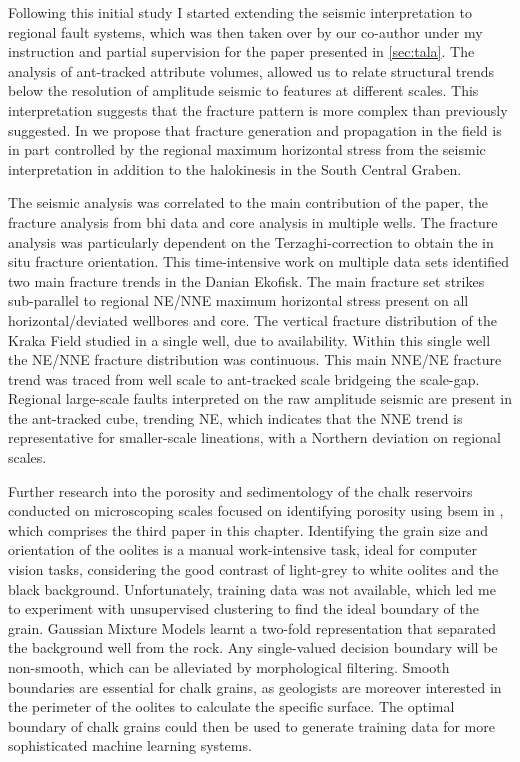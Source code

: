 Following this initial study I started extending the seismic interpretation to regional fault systems, which was then taken over by our co-author under my instruction and partial supervision for the paper presented in \cref{sec:tala}. The analysis of ant-tracked attribute volumes, allowed us to relate structural trends below the resolution of amplitude seismic to features at different scales. This interpretation suggests that the fracture pattern is more complex than previously suggested. In \citet{aabo2018integrated} we propose that fracture generation and propagation in the field is in part controlled by the regional maximum horizontal stress from the seismic interpretation in addition to the halokinesis in the South Central Graben. 

The seismic analysis was correlated to the main contribution of the paper, the fracture analysis from \ac{bhi} data and core analysis in multiple wells. The fracture analysis was particularly dependent on the Terzaghi-correction \citep{terzaghi1965sources} to obtain the in situ fracture orientation. This time-intensive work on multiple data sets identified two main fracture trends in the Danian Ekofisk. The main fracture set strikes sub-parallel to regional NE/NNE maximum horizontal stress present on all horizontal/deviated wellbores and core. The vertical fracture distribution of the Kraka Field studied in a single well, due to availability. Within this single well the NE/NNE fracture distribution was continuous. This main NNE/NE fracture trend was traced from well scale to ant-tracked scale bridgeing the scale-gap. Regional large-scale faults interpreted on the raw amplitude seismic are present in the ant-tracked cube, trending NE, which indicates that the NNE trend is representative for smaller-scale lineations, with a Northern deviation on regional scales. 

Further research into the porosity and sedimentology of the chalk reservoirs conducted on microscoping scales focused on identifying porosity using \acf{bsem} in \citet{dramsch2018gaussian}, which comprises the third paper in this chapter. Identifying the grain size and orientation of the oolites is a manual work-intensive task, ideal for computer vision tasks, considering the good contrast of light-grey to white oolites and the black background. Unfortunately, training data was not available, which led me to experiment with unsupervised clustering to find the ideal boundary of the grain. Gaussian Mixture Models learnt a two-fold representation that separated the background well from the rock. Any single-valued decision boundary will be non-smooth, which can be alleviated by morphological filtering. Smooth boundaries are essential for chalk grains, as geologists are moreover interested in the perimeter of the oolites to calculate the specific surface. The optimal boundary of chalk grains could then be used to generate training data for more sophisticated machine learning systems.

